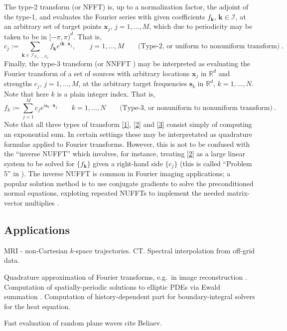 \documentclass[10pt]{article}
\newcommand{\be}{\begin{equation}}
\newcommand{\ee}{\end{equation}}
\newcommand{\mbf}[1]{{\mathbf #1}}
\newcommand{\RR}{\mathbb{R}}
\newcommand{\xx}{\mbf{x}}
\newcommand{\sss}{\mbf{s}}
\newcommand{\kk}{\mbf{k}}
\newcommand{\KK}{{\mathcal I}}     %
\newcommand{\NU}{{nonuniform}}       %
\newcommand{\U}{{uniform}}
\begin{document}
The type-2 transform (or NFFT)
is, up to a normalization factor, the adjoint of the
type-1, and evaluates the Fourier series with given coefficients
$f_\kk$, $\kk\in\KK$, at an arbitrary set of target points
$\xx_j$, $j=1,\ldots,M$, which due to periodicity may be taken to be in $[-\pi,\pi)^d$.
  That is,
  \be
  c_j := \sum_{\kk\in\KK_{N_1,\dots,N_d}} f_\kk e^{i \kk\cdot \xx_j},
  \qquad j=1,\dots, M
\qquad \mbox{(Type-2, or \U\ to \NU\ transform)}
~.
\label{2}
\ee
Finally, the type-3 transform
\cite{nufft3} (or NNFFT \cite{usingnfft})
may be interpreted as evaluating the
Fourier transform of a set of sources with arbitrary locations $\xx_j$
in $\RR^d$
and strengths $c_j$, $j=1,\dots, M$, at the arbitrary target frequencies
$\sss_k$ in $\RR^d$, $k=1,\dots, N$. Note that here $k$ is a plain integer
index.
That is,
\be
f_k := \sum_{j=1}^M c_j e^{i \sss_k \cdot \xx_j}
  \qquad k=1,\dots, N
\qquad \mbox{(Type-3, or \NU\ to \NU\ transform)}
~.
\label{3}
\ee
Note that all three types of transform \eqref{1}, \eqref{2} and \eqref{3}
consist simply of computing an exponential sum.
In certain settings these may be interpretated as quadrature formulae
applied to Fourier transforms.
However, this is not to be confused with the ``inverse NUFFT'' which involves,
for instance, treating \eqref{2} as a large linear system to be solved for
$\{f_\kk\}$ given a right-hand side
$\{c_j\}$ (this is called ``Problem 5'' in \cite{nufft}).
The inverse NUFFT is common in Fourier imaging
applications; a popular solution method is to use
conjugate gradients to solve
the preconditioned normal equations, exploting
repeated NUFFTs to implement the needed matrix-vector multiplies
\cite{fessler,fourmont,fastsinc,gelbrecon}.







\subsection{Applications}

MRI - non-Cartesian $k$-space trajectories.
CT.
Spectral interpolation from off-grid data.

Quadrature approximation of Fourier transforms, e.g.\
in image reconstruction \cite{cryo}.
Computation of spatially-periodic solutions to elliptic
PDEs via Ewald summation
\cite{lindbo11}.
Computation of history-dependent part for boundary-integral solvers
for the heat equation.%

Fast evaluation of random plane waves cite Beliaev.
\end{document}
